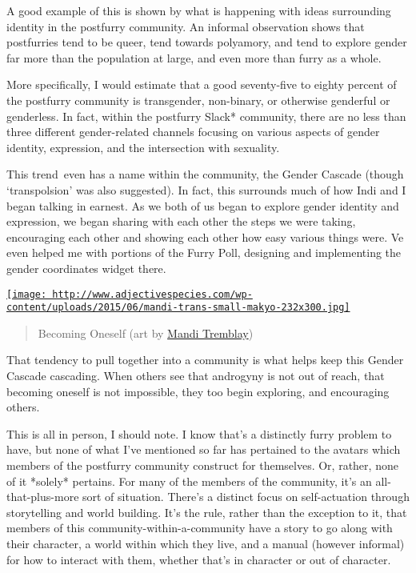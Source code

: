 A good example of this is shown by what is happening with ideas
surrounding identity in the postfurry community. An informal observation
shows that postfurries tend to be queer, tend towards polyamory, and
tend to explore gender far more than the population at large, and even
more than furry as a whole.

More specifically, I would estimate that a good seventy-five to eighty
percent of the postfurry community is transgender, non-binary, or
otherwise genderful or genderless. In fact, within the postfurry Slack*
community, there are no less than three different gender-related
channels focusing on various aspects of gender identity, expression, and
the intersection with sexuality.

This trend~even has a name within the community, the Gender Cascade
(though `transpolsion' was also suggested). In fact, this surrounds much
of how Indi and I began talking in earnest. As we both of us began to
explore gender identity and expression, we began sharing with each other
the steps we were taking, encouraging each other and showing each other
how easy various things were. Ve even helped me with portions of the
Furry Poll, designing and implementing the gender coordinates widget
there.

\href{http://www.adjectivespecies.com/wp-content/uploads/2015/06/mandi-trans-small-makyo.jpg}{\texttt{[image: http://www.adjectivespecies.com/wp-content/uploads/2015/06/mandi-trans-small-makyo-232x300.jpg]}}

\begin{quote}
Becoming Oneself (art by \href{http://mittymandi.tumblr.com/}{Mandi
Tremblay})
\end{quote}

That tendency to pull together into a community is what helps keep this
Gender Cascade cascading. When others see that androgyny is not out of
reach, that becoming oneself is not impossible, they too begin
exploring, and encouraging others.

This is all in person, I should note. I know that's a distinctly furry
problem to have, but none of what I've mentioned so far has pertained to
the avatars which members of the postfurry community construct for
themselves. Or, rather, none of it *solely* pertains. For many of the
members of the community, it's an all-that-plus-more sort of situation.
There's a distinct focus on self-actuation through storytelling and
world building. It's the rule, rather than the exception to it, that
members of this community-within-a-community have a story to go along
with their character, a world within which they live, and a manual
(however informal) for how to interact with them, whether that's in
character or out of character.


